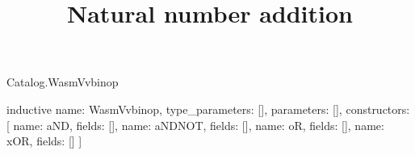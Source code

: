 \begin{lexlean}{Catalog.WasmVvbinop}
\title{Natural number addition}
\begin{semanticmodule}
inductive{
  name: WasmVvbinop,
  type_parameters: [],
  parameters: [],
  constructors: [
    {name: aND, fields: []},
    {name: aNDNOT, fields: []},
    {name: oR, fields: []},
    {name: xOR, fields: []}
  ]
}
\end{semanticmodule}
\end{lexlean}
